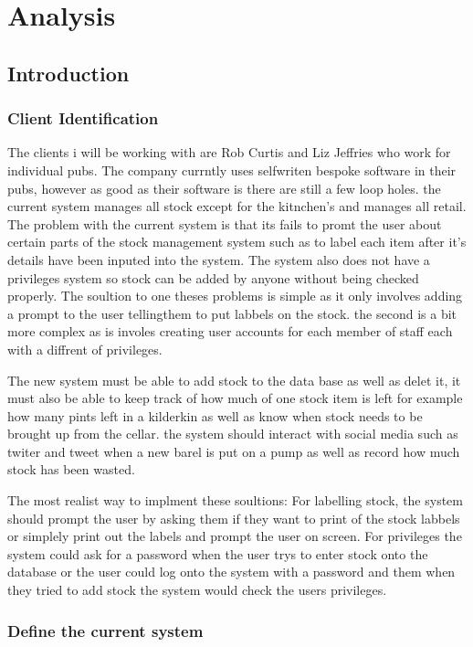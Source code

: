 \chapter{Analysis}

\section{Introduction}

\subsection{Client Identification}
The clients i will be working with are Rob Curtis and Liz Jeffries who work for individual pubs. The company currntly uses selfwriten bespoke software in their pubs, however as good as their software is there are still a few loop holes. the current system manages all stock except for the kitnchen's and manages all retail. 
The problem with the current system is that its fails to promt the user about certain parts of the stock management system such as to label each item after it's details have been inputed into the system. The system also does not have a privileges system so stock can be added by anyone without being checked properly. The soultion to one theses problems is simple as it only involves adding a prompt to the user tellingthem to put labbels on the stock. the second is a bit more complex as is involes creating user accounts for each member of staff each with a diffrent of privileges.

The new system must be able to add stock to the data base as well as delet it, it must also be able to keep track of how much of one stock item is left for example how many pints left in a kilderkin as well as know when stock needs to be brought up from the cellar. the system should interact with social media such as twiter and tweet when a new barel is put on a pump as well as record how much stock has been wasted.

The most realist way to implment these soultions: For labelling stock, the system should prompt the user by asking them if they want to print of the stock labbels or simplely print out the labels and prompt the user on screen. For privileges the system could ask for a password when the user trys to enter stock onto the database or the user could log onto the system with a password and them when they tried to add stock the system would check the users privileges.
\subsection{Define the current system}

